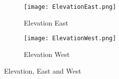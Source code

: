 \begin{figure}[t!]
\centering
\begin{subfigure}{\textwidth}
  \centering
  \texttt{[image: ElevationEast.png]}
  \caption{Elevation East}
  \label{fig:ElevationEast}
\end{subfigure}

\begin{subfigure}{\textwidth}
  \centering
  \texttt{[image: ElevationWest.png]}
  \caption{Elevation West}
  \label{fig:ElevationWest}
\end{subfigure}
\caption{Elevation, East and West}
\label{fig:ElevationEW}
\end{figure}